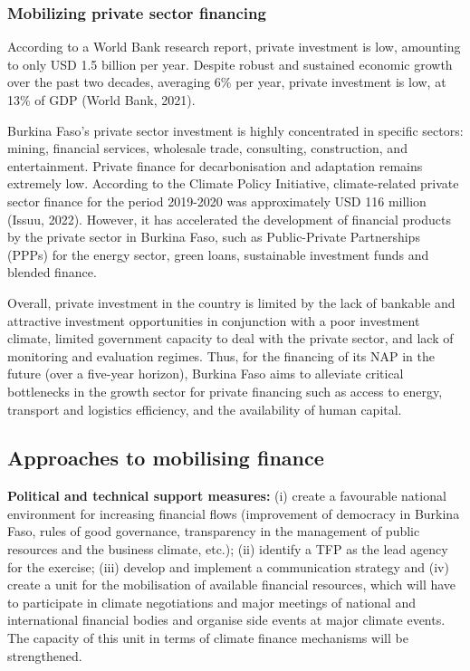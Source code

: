 \documentclass[
]{book}
\begin{document}
\subsubsection{Mobilizing private sector financing}\label{mobilizing-private-sector-financing}

According to a World Bank research report, private investment is low, amounting to only USD 1.5 billion per year. Despite robust and sustained economic growth over the past two decades, averaging 6\% per year, private investment is low, at 13\% of GDP (World Bank, 2021).

Burkina Faso's private sector investment is highly concentrated in specific sectors: mining, financial services, wholesale trade, consulting, construction, and entertainment. Private finance for decarbonisation and adaptation remains extremely low. According to the Climate Policy Initiative, climate-related private sector finance for the period 2019-2020 was approximately USD 116 million (Issuu, 2022). However, it has accelerated the development of financial products by the private sector in Burkina Faso, such as Public-Private Partnerships (PPPs) for the energy sector, green loans, sustainable investment funds and blended finance.

Overall, private investment in the country is limited by the lack of bankable and attractive investment opportunities in conjunction with a poor investment climate, limited government capacity to deal with the private sector, and lack of monitoring and evaluation regimes. Thus, for the financing of its NAP in the future (over a five-year horizon), Burkina Faso aims to alleviate critical bottlenecks in the growth sector for private financing such as access to energy, transport and logistics efficiency, and the availability of human capital.

\subsection{Approaches to mobilising finance}\label{approaches-to-mobilising-finance}

\textbf{Political and technical support measures:} (i) create a favourable national environment for increasing financial flows (improvement of democracy in Burkina Faso, rules of good governance, transparency in the management of public resources and the business climate, etc.); (ii) identify a TFP as the lead agency for the exercise; (iii) develop and implement a communication strategy and (iv) create a unit for the mobilisation of available financial resources, which will have to participate in climate negotiations and major meetings of national and international financial bodies and organise side events at major climate events. The capacity of this unit in terms of climate finance mechanisms will be strengthened.
\end{document}
